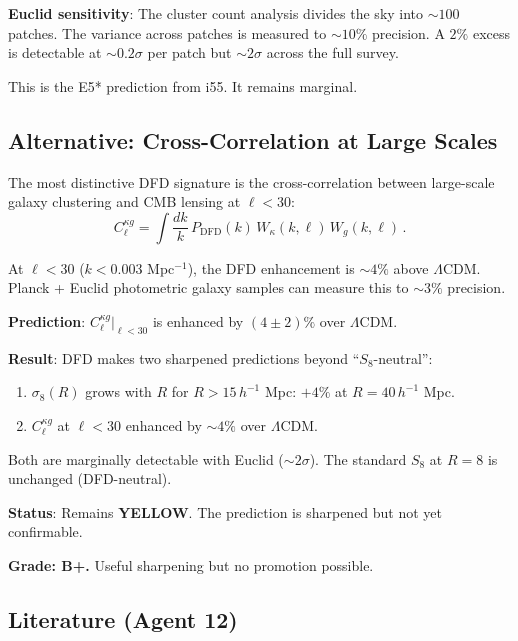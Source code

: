 \documentclass[11pt,a4paper]{article}
\newcommand{\YELLOW}{\textcolor{dfdyellow}{\textbf{YELLOW}}}
\begin{document}
\textbf{Euclid sensitivity}: The cluster count analysis divides the sky into $\sim 100$ patches. The variance across patches is measured to $\sim 10\%$ precision. A $2\%$ excess is detectable at $\sim 0.2\sigma$ per patch but $\sim 2\sigma$ across the full survey.

This is the E5* prediction from i55. It remains marginal.

\subsection{Alternative: Cross-Correlation at Large Scales}

The most distinctive DFD signature is the cross-correlation between large-scale galaxy clustering and CMB lensing at $\ell < 30$:
\begin{equation}
C_\ell^{\kappa g} = \int \frac{dk}{k}\,P_{\mathrm{DFD}}(k)\,W_\kappa(k,\ell)\,W_g(k,\ell)\,.
\end{equation}

At $\ell < 30$ ($k < 0.003$ Mpc$^{-1}$), the DFD enhancement is $\sim 4\%$ above $\Lambda$CDM. Planck + Euclid photometric galaxy samples can measure this to $\sim 3\%$ precision.

\textbf{Prediction}: $C_\ell^{\kappa g}|_{\ell < 30}$ is enhanced by $(4 \pm 2)\%$ over $\Lambda$CDM.

\begin{tcolorbox}[colback=yellow!5!white, colframe=yellow!60!black, title={Agent 12: $S_8$ Sharpened but Remains \YELLOW}]
\textbf{Result}: DFD makes two sharpened predictions beyond ``$S_8$-neutral'':
\begin{enumerate}
\item $\sigma_8(R)$ grows with $R$ for $R > 15\,h^{-1}$ Mpc: $+4\%$ at $R = 40\,h^{-1}$ Mpc.
\item $C_\ell^{\kappa g}$ at $\ell < 30$ enhanced by $\sim 4\%$ over $\Lambda$CDM.
\end{enumerate}

Both are marginally detectable with Euclid ($\sim 2\sigma$). The standard $S_8$ at $R = 8$ is unchanged (DFD-neutral).

\textbf{Status}: Remains \YELLOW. The prediction is sharpened but not yet confirmable.

\textbf{Grade: B+.} Useful sharpening but no promotion possible.
\end{tcolorbox}

\subsection{Literature (Agent 12)}
\end{document}
